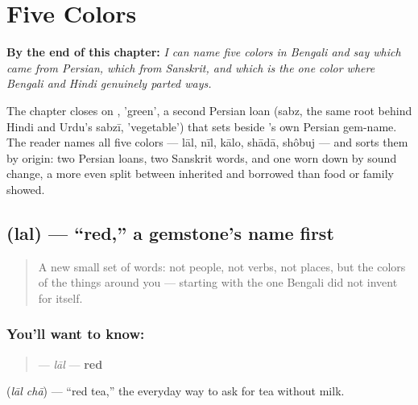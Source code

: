 
\chapter{Five Colors}
\label{ch:bn-five-colors}

\begin{chapteropening}
\textbf{By the end of this chapter:} \emph{I can name five colors in Bengali and say which came from Persian, which from Sanskrit, and which is the one color where Bengali and Hindi genuinely parted ways.}

The chapter closes on , 'green', a second Persian loan (sabz, the same root behind Hindi and Urdu's sabzī, 'vegetable') that sets beside 's own Persian gem-name. The reader names all five colors — lāl, nīl, kālo, shādā, shôbuj — and sorts them by origin: two Persian loans, two Sanskrit words, and one worn down by sound change, a more even split between inherited and borrowed than food or family showed.
\end{chapteropening}

\section[lal]{ (lal) — \textquotedblleft{}red,\textquotedblright{} a gemstone's name first}

\label{lesson:BN-C14-lal}



\begin{quote}
A new small set of words: not people, not verbs, not places, but the colors of the things around you — starting with the one Bengali did not invent for itself.
\end{quote}

\subsection*{You'll want to know: }
\begin{quote}
\textbf{} — \emph{lāl} — \textbf{red}
\end{quote}

  (\emph{lāl chā}) — \textquotedblleft{}red tea,\textquotedblright{} the everyday way to ask for tea without milk.

